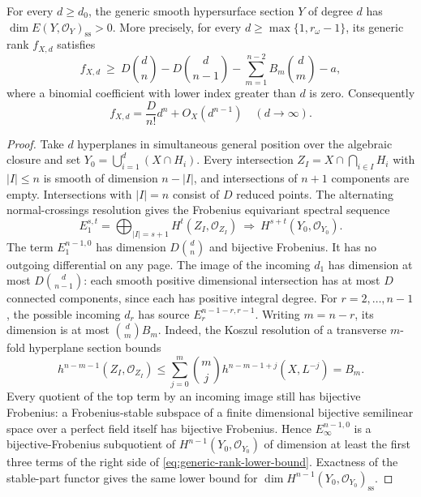 \begin{theorem}\label{thm:all-X-explicit-positive-rank}
For every $d\geq d_0$, the generic smooth hypersurface section $Y$ of
degree $d$ has
$\dim E(Y,\mathcal O_Y)_{\mathrm{ss}}>0$.
More precisely, for every $d\geq\max\{1,r_\omega-1\}$, its generic
rank $f_{X,d}$ satisfies
\begin{equation}\label{eq:generic-rank-lower-bound}
 f_{X,d}\ \geq\
 D\binom dn-D\binom d{n-1}
 -\sum_{m=1}^{n-2}B_m\binom dm-a,
\end{equation}
where a binomial coefficient with lower index greater than $d$ is zero.
Consequently
\[
 f_{X,d}=\frac{D}{n!}d^n+O_X(d^{n-1})\quad(d\longrightarrow\infty).
\]
\end{theorem}

\begin{proof}
Take $d$ hyperplanes in simultaneous general position over the
algebraic closure and set $Y_0=\bigcup_{i=1}^d(X\cap H_i)$.
Every intersection $Z_I=X\cap\bigcap_{i\in I}H_i$ with $|I|\leq n$
is smooth of dimension $n-|I|$, and intersections of $n+1$ components
are empty.  Intersections with $|I|=n$ consist of $D$ reduced points.
The alternating normal-crossings resolution gives the Frobenius
equivariant spectral sequence
\[
 E_1^{s,t}=\bigoplus_{|I|=s+1}H^t(Z_I,\mathcal O_{Z_I})
 \ \Longrightarrow\ H^{s+t}(Y_0,\mathcal O_{Y_0}).
\]
The term $E_1^{n-1,0}$ has dimension $D\binom dn$ and bijective
Frobenius.  It has no outgoing differential on any page.  The image
of the incoming $d_1$ has dimension at most
$D\binom d{n-1}$: each smooth positive dimensional intersection has
at most $D$ connected components, since each has positive integral
degree.  For $r=2,\ldots,n-1$, the possible incoming $d_r$ has source
$E_r^{n-1-r,r-1}$.  Writing $m=n-r$, its dimension is at most
$\binom dm B_m$.  Indeed, the Koszul resolution of a transverse
$m$-fold hyperplane section bounds
\[
 h^{n-m-1}(Z_I,\mathcal O_{Z_I})
 \leq\sum_{j=0}^{m}\binom mj
 h^{n-m-1+j}(X,L^{-j})=B_m.
\]
Every quotient of the top term by an incoming image still has
bijective Frobenius: a Frobenius-stable subspace of a finite dimensional
bijective semilinear space over a perfect field itself has bijective
Frobenius.  Hence $E_\infty^{n-1,0}$ is a bijective-Frobenius subquotient
of $H^{n-1}(Y_0,\mathcal O_{Y_0})$ of dimension at least the first three
terms of the right side of \eqref{eq:generic-rank-lower-bound}.
Exactness of the stable-part functor gives the same lower bound for
$\dim H^{n-1}(Y_0,\mathcal O_{Y_0})_{\mathrm{ss}}$.


\end{proof}
